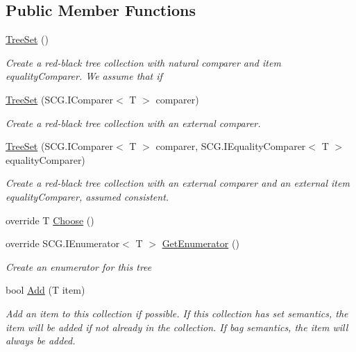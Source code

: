 \subsection*{Public Member Functions}
\begin{DoxyCompactItemize}
\item 
\hyperlink{class_c5_1_1_tree_set_a035e624e1221baf19a1e3fa006992a60}{Tree\+Set} ()
\begin{DoxyCompactList}\small\item\em Create a red-\/black tree collection with natural comparer and item equality\+Comparer. We assume that if \end{DoxyCompactList}\item 
\hyperlink{class_c5_1_1_tree_set_a3c3516e003070d40b60d0375cb1087f9}{Tree\+Set} (S\+C\+G.\+I\+Comparer$<$ T $>$ comparer)
\begin{DoxyCompactList}\small\item\em Create a red-\/black tree collection with an external comparer. \end{DoxyCompactList}\item 
\hyperlink{class_c5_1_1_tree_set_a75bbf30214577fb95e4caec425689b8d}{Tree\+Set} (S\+C\+G.\+I\+Comparer$<$ T $>$ comparer, S\+C\+G.\+I\+Equality\+Comparer$<$ T $>$ equality\+Comparer)
\begin{DoxyCompactList}\small\item\em Create a red-\/black tree collection with an external comparer and an external item equality\+Comparer, assumed consistent. \end{DoxyCompactList}\item 
override T \hyperlink{class_c5_1_1_tree_set_aa4dd484b7c4363226e1053c8b2edd851}{Choose} ()
\item 
override S\+C\+G.\+I\+Enumerator$<$ T $>$ \hyperlink{class_c5_1_1_tree_set_af9dd4aece1415276e1ede1ded6904179}{Get\+Enumerator} ()
\begin{DoxyCompactList}\small\item\em Create an enumerator for this tree \end{DoxyCompactList}\item 
bool \hyperlink{class_c5_1_1_tree_set_ae2a3723eb4c1fabdb5b75d52d709f880}{Add} (T item)
\begin{DoxyCompactList}\small\item\em Add an item to this collection if possible. If this collection has set semantics, the item will be added if not already in the collection. If bag semantics, the item will always be added. \end{DoxyCompactList}\item 

\end{DoxyCompactItemize}

